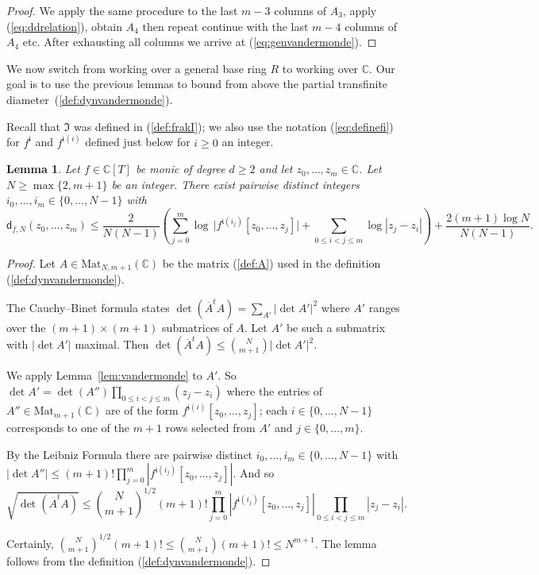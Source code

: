 \documentclass[12pt,oneside,a4]{amsart}
\newcommand{\IC}{\mathbb{C}}
\newcounter{maincounter}
\numberwithin{maincounter}{section}
\numberwithin{equation}{section}
\newtheorem{lemma}[maincounter]{Lemma}
\begin{document}
\begin{proof}
  We apply the same procedure to the last $m-3$ columns of $A_3$,
  apply (\ref{eq:ddrelation}), obtain $A_4$ then repeat continue with
  the last $m-4$ columns of $A_4$ etc. After exhausting all columns we
  arrive at (\ref{eq:genvandermonde}).
\end{proof}

We now switch from working over a general base ring $R$ to working
over $\IC$. Our goal is to use the previous lemmas to bound from above the
partial transfinite diameter~(\ref{def:dynvandermonde}).

Recall that $\mathfrak{I}$ was defined in (\ref{def:frakI}); we also
use the notation (\ref{eq:definefi}) for $f^{\mathfrak{i}}$
and $f^{\mathfrak{i}(i)}$ defined just below for $i\ge 0$ an integer.

\begin{lemma}
  \label{lem:DfNddbound}
  Let $f\in \IC[T]$ be monic of degree $d\ge 2$ and let
  $z_0,\ldots,z_m\in\IC$. Let $N\ge \max\{2,m+1\}$ be an integer.
  There exist pairwise distinct integers $i_0,\ldots,i_m\in \{0,\ldots,N-1\}$ with
  \begin{equation}
    \label{eq:DfNz0zmbd}
    \mathsf{d}_{f,N}(z_0,\ldots,z_m) \le \frac{2}{N(N-1)}\left(\sum_{j=0}^m
    \log  \,\bigl|f^{\mathfrak{i}(i_j)}[z_0,\ldots,z_j]\bigr|
    + \sum_{0\le i<j\le m}\log|z_j-z_i|\right) + \frac{2(m+1)\log
  N}{N(N-1)}. 
  \end{equation}
\end{lemma}
\begin{proof}
  Let $A\in \mathrm{Mat}_{N,m+1}(\IC)$ be the matrix (\ref{def:A})
  used in the definition (\ref{def:dynvandermonde}).
  
  The Cauchy--Binet formula states $\det(\overline A^t A) = \sum_{A'}
  |\det A'|^2$  where $A'$ ranges over the $(m+1)\times(m+1)$ submatrices
  of $A$.
  Let $A'$ be such a submatrix with $|\det A'|$ maximal. Then
  $\det(\overline A^t A) \le {N\choose m+1} |\det A'|^2$. 

  We apply Lemma~\ref{lem:vandermonde} to $A'$.
  So $\det A'=\det(A'') \prod_{0\le i<j\le m} (z_j-z_i)$
  where the entries of $A''\in \mathrm{Mat}_{m+1}(\IC)$ 
  are of the form  $f^{\mathfrak{i}(i)}[z_0,\ldots,z_j]$; each
  $i \in\{0,\ldots,N-1\}$ corresponds to one of
  the $m+1$ rows selected from $A'$ and $j\in \{0,\ldots,m\}$.
  
  By the Leibniz Formula there are pairwise distinct
   $i_0,\ldots,i_m\in\{0,\ldots,N-1\}$ with
  $|\det A''|\le (m+1)! \prod_{j=0}^m
  |f^{\mathfrak{i}(i_j)}[z_0,\ldots,z_j]|$.  
  And so
  $$
  \sqrt{\det(\overline A^t A)} \le {N\choose m+1}^{1/2} (m+1)!
  \prod_{j=0}^m 
  |f^{\mathfrak{i}(i_j)}[z_0,\ldots,z_j]|\prod_{0\le i<j\le m}|z_j-z_i|.
  $$
  
  Certainly, ${N\choose m+1}^{1/2}(m+1)! \le {N\choose m+1}(m+1)! \le
  N^{m+1}$. The lemma follows from the definition
  (\ref{def:dynvandermonde}).  
\end{proof}
\end{document}
